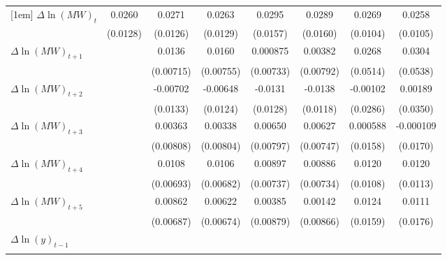 {\begin{tabular}{l*{7}{c}}
[1em]
$\Delta \ln(MW)_{t}$&   0.0260\sym{**} &   0.0271\sym{**} &   0.0263\sym{**} &   0.0295\sym{*}  &   0.0289\sym{*}  &   0.0269\sym{**} &   0.0258\sym{**} \\
          & (0.0128)         & (0.0126)         & (0.0129)         & (0.0157)         & (0.0160)         & (0.0104)         & (0.0105)         \\
[1em]
$\Delta \ln(MW)_{t+1}$&                  &   0.0136\sym{*}  &   0.0160\sym{**} & 0.000875         &  0.00382         &   0.0268         &   0.0304         \\
          &                  &(0.00715)         &(0.00755)         &(0.00733)         &(0.00792)         & (0.0514)         & (0.0538)         \\
[1em]
$\Delta \ln(MW)_{t+2}$&                  & -0.00702         & -0.00648         &  -0.0131         &  -0.0138         & -0.00102         &  0.00189         \\
          &                  & (0.0133)         & (0.0124)         & (0.0128)         & (0.0118)         & (0.0286)         & (0.0350)         \\
[1em]
$\Delta \ln(MW)_{t+3}$&                  &  0.00363         &  0.00338         &  0.00650         &  0.00627         & 0.000588         &-0.000109         \\
          &                  &(0.00808)         &(0.00804)         &(0.00797)         &(0.00747)         & (0.0158)         & (0.0170)         \\
[1em]
$\Delta \ln(MW)_{t+4}$&                  &   0.0108         &   0.0106         &  0.00897         &  0.00886         &   0.0120         &   0.0120         \\
          &                  &(0.00693)         &(0.00682)         &(0.00737)         &(0.00734)         & (0.0108)         & (0.0113)         \\
[1em]
$\Delta \ln(MW)_{t+5}$&                  &  0.00862         &  0.00622         &  0.00385         &  0.00142         &   0.0124         &   0.0111         \\
          &                  &(0.00687)         &(0.00674)         &(0.00879)         &(0.00866)         & (0.0159)         & (0.0176)         \\
[1em]
$\Delta \ln(y)_{t-1}$&                  &                  &                  &                  &                  &                  &                  \\
          &                  &                  &                  &                  &                  &                  &                  \\

\end{tabular}}
